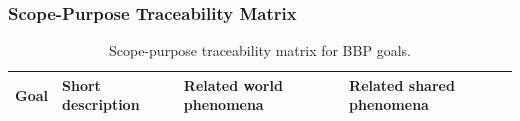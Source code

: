 \subsubsection{Scope-Purpose Traceability Matrix}
{\small
\setlength{\tabcolsep}{4pt}
\setlength{\LTleft}{\fill}
\setlength{\LTright}{\fill}
\begin{longtable}{>{\raggedright\arraybackslash}p{}>{\raggedright\arraybackslash}p{}>{\raggedright\arraybackslash}p{}>{\raggedright\arraybackslash}p{}}
\caption{Scope-purpose traceability matrix for BBP goals.}\label{tab:scope-purpose-traceability}\\
\toprule
\textbf{Goal} & \textbf{Short description} & \textbf{Related world phenomena} & \textbf{Related shared phenomena} \\
\midrule
\endfirsthead


\end{longtable}}
